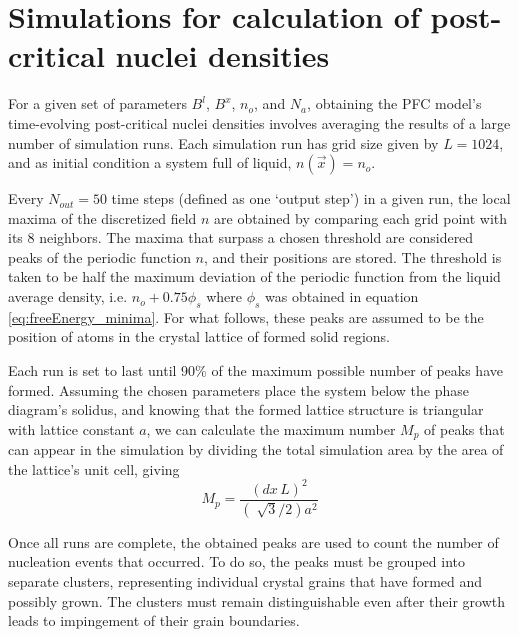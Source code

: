 \section{Simulations for calculation of post-critical nuclei densities}\label{sec:num_rates}

For a given set of parameters $B^l$, $B^x$, $n_o$, and $N_a$, obtaining the PFC model's time-evolving post-critical nuclei densities involves averaging the results of a large number of simulation runs. Each simulation run has grid size given by $L=1024$, and as initial condition a system full of liquid, $n(\vec{x})=n_o$.

Every $N_{out}=50$ time steps (defined as one `output step') in a given run, the local maxima of the discretized field $n$ are obtained by comparing each grid point with its 8 neighbors. The maxima that surpass a chosen threshold are considered peaks of the periodic function $n$, and their positions are stored. The threshold is taken to be half the maximum deviation of the periodic function from the liquid average density, i.e. $n_o + 0.75\phi_s$ where $\phi_s$ was obtained in equation \ref{eq:freeEnergy_minima}. For what follows, these peaks are assumed to be the position of atoms in the crystal lattice of formed solid regions.

Each run is set to last until 90\% of the maximum possible number of peaks have formed. Assuming the chosen parameters place the system below the phase diagram's solidus, and knowing that the formed lattice structure is triangular with lattice constant $a$, we can calculate the maximum number $M_p$ of peaks that can appear in the simulation by dividing the total simulation area by the area of the lattice's unit cell, giving
\begin{equation}
M_p = \frac{(dx\,L)^2}{(\sqrt[]{3}/2)a^2}
\end{equation}

Once all runs are complete, the obtained peaks are used to count the number of nucleation events that occurred. To do so, the peaks must be grouped into separate clusters, representing individual crystal grains that have formed and possibly grown. The clusters must remain distinguishable even after their growth leads to impingement of their grain boundaries. 


